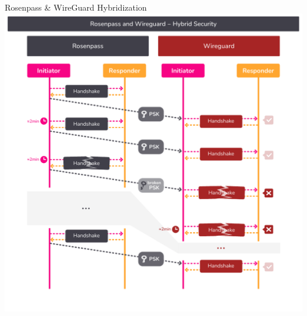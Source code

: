 \begin{frame}{Rosenpass \& WireGuard Hybridization}
  \centering
  \includegraphics[height=1.03\textheight, clip=true,trim=0cm 0cm 0cm 3.2cm]{graphics/rosenpass-wireguard-hybrid-security.pdf}
\end{frame}
